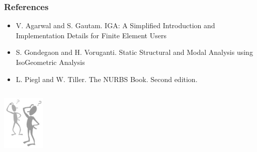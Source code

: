 \documentclass{beamer}
\begin{document}
\begin{frame}\frametitle{References}
  \begin{itemize}
      \item V. Agarwal and S. Gautam. IGA: A Simplified Introduction and Implementation Details for Finite Element Users
      \item S. Gondegaon and H. Voruganti. Static Structural and Modal Analysis using IsoGeometric Analysis
      \item L. Piegl and W. Tiller. The NURBS Book. Second edition. 
  \end{itemize}
  \begin{columns}
    \column{6cm}
    \begin{block}{}
      \centerline{ 
        \includegraphics[width=0.5\textwidth]{figures/questions.png} 
      }
    \end{block}
  \end{columns}
  
\end{frame}
\end{document}
